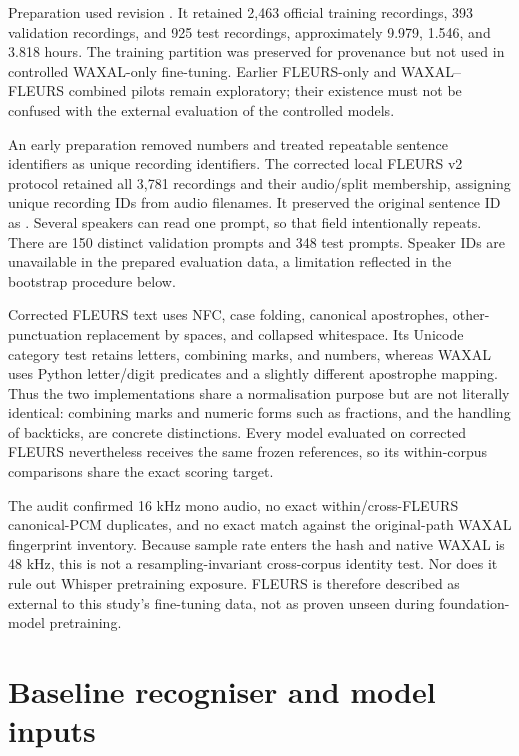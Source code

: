 \documentclass[12pt,a4paper]{report}
\newcommand{\code}[1]{\texttt{\detokenize{#1}}}
\begin{document}
Preparation used revision \code{70bb2e84b976b7e960aa89f1c648e09c59f894dd}. It retained 2,463 official training recordings, 393 validation recordings, and 925 test recordings, approximately 9.979, 1.546, and 3.818 hours. The training partition was preserved for provenance but not used in controlled WAXAL-only fine-tuning. Earlier FLEURS-only and WAXAL--FLEURS combined pilots remain exploratory; their existence must not be confused with the external evaluation of the controlled models.

An early preparation removed numbers and treated repeatable sentence identifiers as unique recording identifiers. The corrected local FLEURS v2 protocol retained all 3,781 recordings and their audio/split membership, assigning unique recording IDs from audio filenames. It preserved the original sentence ID as \code{source_id}. Several speakers can read one prompt, so that field intentionally repeats. There are 150 distinct validation prompts and 348 test prompts. Speaker IDs are unavailable in the prepared evaluation data, a limitation reflected in the bootstrap procedure below.

Corrected FLEURS text uses NFC, case folding, canonical apostrophes, other-punctuation replacement by spaces, and collapsed whitespace. Its Unicode category test retains letters, combining marks, and numbers, whereas WAXAL uses Python letter/digit predicates and a slightly different apostrophe mapping. Thus the two implementations share a normalisation purpose but are not literally identical: combining marks and numeric forms such as fractions, and the handling of backticks, are concrete distinctions. Every model evaluated on corrected FLEURS nevertheless receives the same frozen references, so its within-corpus comparisons share the exact scoring target.

The audit confirmed 16 kHz mono audio, no exact within/cross-FLEURS canonical-PCM duplicates, and no exact match against the original-path WAXAL fingerprint inventory. Because sample rate enters the hash and native WAXAL is 48 kHz, this is not a resampling-invariant cross-corpus identity test. Nor does it rule out Whisper pretraining exposure. FLEURS is therefore described as external to this study's fine-tuning data, not as proven unseen during foundation-model pretraining.

\section{Baseline recogniser and model inputs}
\label{sec:baseline}
\end{document}
